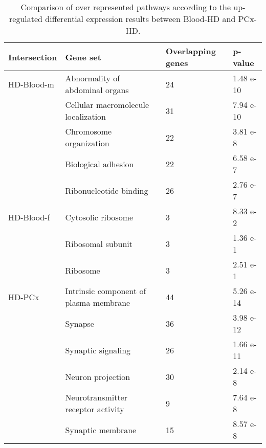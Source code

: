 \begin{table}[!ht]
\centering
\caption{Comparison of over represented pathways according to the up-regulated differential expression results between Blood-HD and PCx-HD.}
\begin{tabularx}{11cm}{L{2cm}L{2.5cm}L{3cm}C{1.5cm}}
\toprule
\textbf{Intersection} & \textbf{Gene set} & \textbf{Overlapping genes} & \textbf{p-value} \\
\midrule
HD-Blood-m & Abnormality of abdominal organs          & 24 & 1.48 e-10 \\
           & Cellular macromolecule localization    & 31 & 7.94 e-10 \\
           & Chromosome organization                & 22 & 3.81 e-8  \\
           & Biological adhesion                    & 22 & 6.58 e-7  \\
           & Ribonucleotide binding                 & 26 & 2.76 e-7  \\
HD-Blood-f & Cytosolic ribosome                     & 3  & 8.33 e-2  \\
           & Ribosomal subunit                      & 3  & 1.36 e-1  \\
           & Ribosome                                 & 3  & 2.51 e-1  \\
HD-PCx     & Intrinsic component of plasma membrane & 44 & 5.26 e-14 \\
           & Synapse                                  & 36 & 3.98 e-12 \\
           & Synaptic signaling                     & 26 & 1.66 e-11 \\
           & Neuron projection                      & 30 & 2.14 e-8  \\
           & Neurotransmitter receptor activity     & 9  & 7.64 e-8  \\
           & Synaptic membrane                      & 15 & 8.57 e-8  \\
\bottomrule
\end{tabularx}
\end{table}



